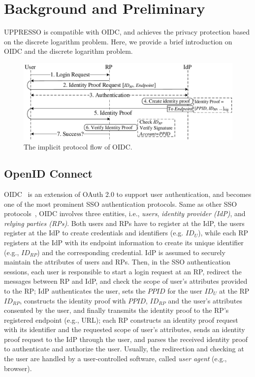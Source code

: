 \section{Background and Preliminary}
\label{sec:background}
UPPRESSO is compatible with OIDC, and achieves the privacy protection based on the discrete logarithm problem.
Here, we provide a brief introduction on OIDC and the discrete logarithm problem.
\begin{figure}[t]
  \centering
  \includegraphics[width=\linewidth]{fig/OIDC1.pdf}
  \caption{The implicit protocol flow of OIDC.}
  \label{fig:OpenID}
\end{figure}
\subsection{OpenID Connect}
\label{subsec:OIDC}
OIDC~\cite{OpenIDConnect} is an extension of OAuth 2.0 to support user authentication,
 and becomes one of the most prominent SSO authentication protocols.
Same as other SSO protocols~\cite{SAMLIdentifier}, OIDC involves three entities, i.e., {\em users}, {\em identity provider (IdP)}, and {\em relying parties (RPs)}.
Both users and RPs have to register at the IdP,
the users register at the IdP to create credentials and identifiers (e.g. $ID_U$),
while each RP registers at the IdP with its endpoint information to create its unique identifier (e.g., $ID_{RP}$) and the corresponding credential.
IdP is assumed to securely maintain the attributes  of users and RPs.
Then, in the SSO authentication sessions,
 each user is responsible to start a login request at an RP, redirect the messages between RP and IdP, and check the scope of user's attributes provided to the RP;
 IdP authenticates the user, sets the $PPID$ for the user $ID_U$ at the RP $ID_{RP}$,
 constructs the identity proof with  $PPID$, $ID_{RP}$ and the user's attributes consented by the user, and finally transmits the identity proof to the RP's registered endpoint (e.g., URL);
 each RP constructs an identity proof request with its identifier and the requested scope of  user's attributes, sends an identity proof request to the IdP through the user, and parses the received identity proof to authenticate and authorize the user.
Usually, the redirection and checking at the user are handled by a user-controlled software, called {\em user agent} (e.g., browser).



